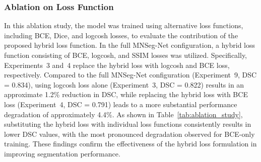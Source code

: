\subsubsection{Ablation on Loss Function}
In this ablation study, the model was trained using alternative loss functions, including BCE, Dice, and logcosh losses, to evaluate the contribution of the proposed hybrid loss function. In the full MNSeg-Net configuration, a hybrid loss function consisting of BCE, logcosh, and SSIM losses was utilized. Specifically, Experiments~3 and~4 replace the hybrid loss with logcosh and BCE loss, respectively. Compared to the full MNSeg-Net configuration (Experiment~9, DSC = 0.834), using logcosh loss alone (Experiment~3, DSC = 0.822) results in an approximate 1.2\% reduction in DSC, while replacing the hybrid loss with BCE loss (Experiment~4, DSC = 0.791) leads to a more substantial performance degradation of approximately 4.4\%. As shown in Table~\ref{tab:ablation_study}, substituting the hybrid loss with individual loss functions consistently results in lower DSC values, with the most pronounced degradation observed for BCE-only training. These findings confirm the effectiveness of the hybrid loss formulation in improving segmentation performance.





